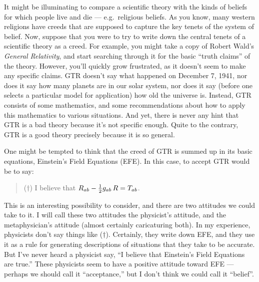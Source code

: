 It might be illuminating to compare a scientific theory with the kinds
of beliefs for which people live and die --- e.g.\ religious beliefs.
As you know, many western religions have creeds that are supposed to
capture the key tenets of the system of belief.  Now, suppose that you
were to try to write down the central tenets of a scientific theory as
a creed.  For example, you might take a copy of Robert Wald's {\it
  General Relativity}, and start searching through it for the basic
``truth claims'' of the theory.  However, you'll quickly grow
frustrated, as it doesn't seem to make any specific claims.  GTR
doesn't say what happened on December 7, 1941, nor does it say how
many planets are in our solar system, nor does it say (before one
selects a particular model for application) how old the universe is.
Instead, GTR consists of some mathematics, and some recommendations
about how to apply this mathematics to various situations.  And yet,
there is never any hint that GTR is a bad theory because it's not
specific enough.  Quite to the contrary, GTR is a good theory
precisely because it is so general.

One might be tempted to think that the creed of GTR is summed up in
its basic equations, Einstein's Field Equations (EFE).  In this case,
to accept GTR would be to say:
\begin{quote} ($\dagger$) I believe that
  $R_{ab} - {1 \over 2}g_{ab}\,R = T_{ab}$. \end{quote} This is an
interesting possibility to consider, and there are two attitudes we
could take to it.  I will call these two attitudes the physicist's
attitude, and the metaphysician's attitude (almost certainly
caricaturing both).  In my experience, physicists don't say things
like ($\dagger$).  Certainly, they write down EFE, and they use it as
a rule for generating descriptions of situations that they take to be
accurate.  But I've never heard a physicist say, ``I believe that
Einstein's Field Equations are true.''  These physicists seem to have
a positive attitude toward EFE --- perhaps we should call it
``acceptance,'' but I don't think we could call it ``belief''.

